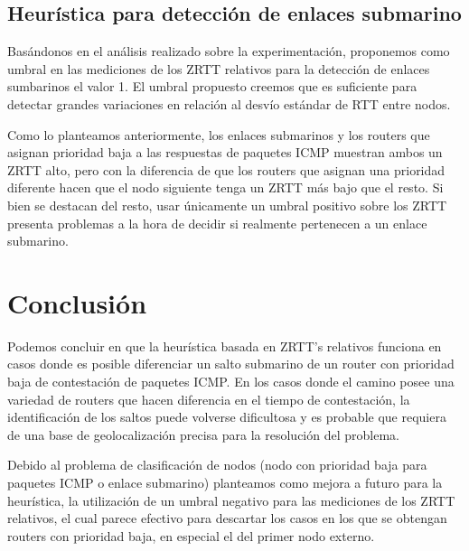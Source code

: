 \documentclass[a4paper, 10pt, twoside]{article}
\begin{document}
\subsection{Heurística para detección de enlaces submarino}

Basándonos en el análisis realizado sobre la experimentación, proponemos como umbral en las mediciones de los ZRTT relativos para la detección de enlaces sumbarinos el valor 1. El umbral propuesto creemos que es suficiente para detectar grandes variaciones en relación al desvío estándar de RTT entre nodos.

Como lo planteamos anteriormente, los enlaces submarinos y los routers que asignan prioridad baja a las respuestas de paquetes ICMP muestran ambos un ZRTT alto, pero con la diferencia de que los routers que asignan una prioridad diferente hacen que el nodo siguiente tenga un ZRTT más bajo que el resto. Si bien se destacan del resto, usar únicamente un umbral positivo sobre los ZRTT presenta problemas a la hora de decidir si realmente pertenecen a un enlace submarino.




\section{Conclusión}

Podemos concluir en que la heurística basada en ZRTT's relativos funciona en casos donde es posible diferenciar un salto submarino de un router con prioridad baja de contestación de paquetes ICMP. En los casos donde el camino posee una variedad de routers que hacen diferencia en el tiempo de contestación, la identificación de los saltos puede volverse dificultosa y es probable que requiera de una base de geolocalización precisa para la resolución del problema.

Debido al problema de clasificación de nodos (nodo con prioridad baja para paquetes ICMP o enlace submarino) planteamos como mejora a futuro para la heurística, la utilización de un umbral negativo para las mediciones de los ZRTT relativos, el cual parece efectivo para descartar los casos en los que se obtengan routers con prioridad baja, en especial el del primer nodo externo.


\end{document}
